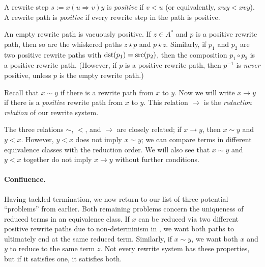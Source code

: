 \documentclass[../generics]{subfiles}
\begin{document}
\begin{definition}
A rewrite step $s := x(u\Rightarrow v)y$ is \emph{positive} if $v<u$ (or equivalently, $xuy<xvy$). A rewrite path is \emph{positive} if every rewrite step in the path is positive.
\end{definition}
An empty rewrite path is vacuously positive. If $z\in A^*$ and $p$ is a positive rewrite path, then so are the whiskered paths $z\star p$ and $p\star z$. Similarly, if $p_1$ and $p_2$ are two positive rewrite paths with $\operatorname{dst}(p_1)=\operatorname{src}(p_2)$, then the composition $p_1\circ p_2$ is a positive rewrite path. (However, if $p$ is a positive rewrite path, then $p^{-1}$ is \emph{never} positive, unless $p$ is the empty rewrite path.)
\begin{definition}
Recall that $x\sim y$ if there is a rewrite path from $x$ to $y$. Now we will write $x\rightarrow y$ if there is a \emph{positive} rewrite path from $x$ to $y$. This relation \index{$\rightarrow$}$\rightarrow$ is the \emph{reduction relation} of our rewrite system.
\end{definition}

The three relations $\sim$, $<$, and $\rightarrow$ are closely related; if $x\rightarrow y$, then $x\sim y$ and $y<x$. However, $y<x$ does not imply $x\sim y$; we can compare terms in different equivalence classes with the reduction order. We will also see that $x\sim y$ and $y<x$ together do not imply $x\rightarrow y$ without further conditions.

\paragraph{Confluence.}
Having tackled termination, we now return to our list of three potential ``problems'' from earlier. Both remaining problems concern the uniqueness of reduced terms in an equivalence class. If $x$ can be reduced via two different positive rewrite paths due to non-determinism in , we want both paths to ultimately end at the same reduced term. Similarly, if $x\sim y$, we want both $x$ and $y$ to reduce to the same term $z$. Not every rewrite system has these properties, but if it satisfies one, it satisfies both.
\end{document}
